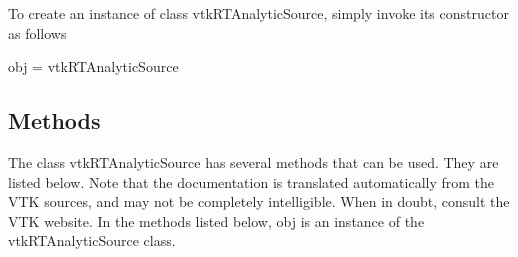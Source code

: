 To create an instance of class vtk\-R\-T\-Analytic\-Source, simply invoke its constructor as follows \begin{DoxyVerb}  obj = vtkRTAnalyticSource
\end{DoxyVerb}
 \hypertarget{vtkwidgets_vtkxyplotwidget_Methods}{}\subsection{Methods}\label{vtkwidgets_vtkxyplotwidget_Methods}
The class vtk\-R\-T\-Analytic\-Source has several methods that can be used. They are listed below. Note that the documentation is translated automatically from the V\-T\-K sources, and may not be completely intelligible. When in doubt, consult the V\-T\-K website. In the methods listed below, {\ttfamily obj} is an instance of the vtk\-R\-T\-Analytic\-Source class. 
